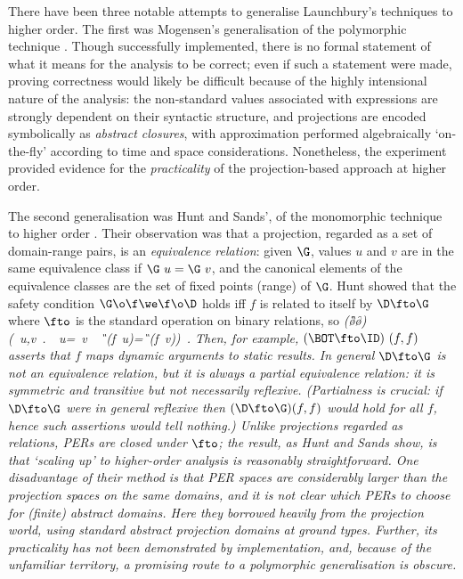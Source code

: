 \documentclass[11pt]{article}
\begin{document}
There have been three notable attempts to generalise Launchbury's
techniques to higher order.  The first was Mogensen's generalisation
of the polymorphic technique \cite{Mog89}.  Though successfully
implemented, there is no formal statement of what it means for the
analysis to be correct; even if such a statement were made, proving
correctness would likely be difficult because of the highly
intensional nature of the analysis: the non-standard values associated
with expressions are strongly dependent on their syntactic structure,
and projections are encoded symbolically as {\it abstract closures\/},
with approximation performed algebraically `on-the-fly' according to
time and space considerations.  Nonetheless, the experiment provided
evidence for the {\it practicality\/} of the projection-based approach
at higher order.

The second generalisation was Hunt and Sands', of the monomorphic
technique to higher order \cite{HS91}.  Their observation was that a
projection, regarded as a set of domain-range pairs, is an {\it
equivalence relation\/}: given $\G$, values $u$ and $v$ are in the
same equivalence class if $\G~u=\G~v$, and the canonical elements of
the equivalence classes are the set of fixed points (range) of $\G$.
Hunt showed that the safety condition $\G\o\f\we\f\o\D$ holds iff $f$
is related to itself by $\D\fto\G$ where $\fto$ is the standard
operation on binary relations, so 
\beqs
\it (\G\o\f\we\f\o\D)\Leftrightarrow(\forall\ u,v\ .\ \D\ u=\D\ v\ \Rightarrow\ \G\ (f\ u)=\G\ (f\ v))\ .
\eeqs
Then, for example, $(\BOT\fto\ID)~(f,f)$ asserts
that $f$ maps dynamic arguments to static results.  In general
$\D\fto\G$ is not an equivalence relation, but it is always a {\it
partial\/} equivalence relation: it is symmetric and transitive but
not necessarily reflexive.  (Partialness is crucial: if $\D\fto\G$
were in general reflexive then $(\D\fto\G)(f,f)$ would hold for all
$f$, hence such assertions would tell nothing.)  Unlike projections
regarded as relations, PERs are closed under $\fto$; the result, as
Hunt and Sands show, is that `scaling up' to higher-order analysis is
reasonably straightforward.  One disadvantage of their method is that
PER spaces are considerably larger than the projection spaces on the
same domains, and it is not clear which PERs to choose for (finite)
abstract domains.  Here they borrowed heavily from the projection
world, using standard abstract projection domains at ground types.
Further, its practicality has not been demonstrated by implementation,
and, because of the unfamiliar territory, a promising route to a
polymorphic generalisation is obscure.
\end{document}
